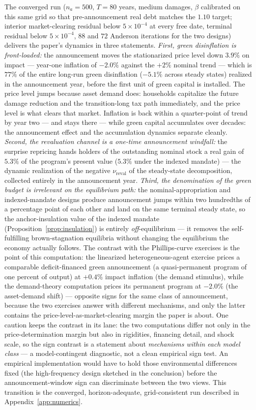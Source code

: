 \documentclass[12pt]{article}
\begin{document}
The converged run ($n_a = 500$, $T = 80$ years, medium damages, $\beta$
calibrated on this same grid so that pre-announcement real debt matches
the $1.10$ target; interior market-clearing residual below $5\times10^{-4}$
at every free date, terminal residual below $5\times10^{-4}$, $88$ and
$72$ Anderson iterations for the two designs) delivers the paper's
dynamics in three statements. \emph{First, green disinflation is
front-loaded:} the announcement moves the stationarized price level down
$3.9\%$ on impact --- year-one inflation of $-2.0\%$ against the $+2\%$
nominal trend --- which is $77\%$ of the entire long-run green
disinflation ($-5.1\%$ across steady states) realized in the announcement
year, before the first unit of green capital is installed. The price
level jumps because asset demand does: households capitalize the future
damage reduction and the transition-long tax path immediately, and the
price level is what clears that market. Inflation is back within a
quarter-point of trend by year two --- and stays there --- while green
capital accumulates over decades: the announcement effect and the
accumulation dynamics separate cleanly.
\emph{Second, the revaluation channel is a one-time announcement windfall:}
the surprise repricing hands holders of the outstanding nominal stock a
real gain of $5.3\%$ of the program's present value ($5.3\%$ under the
indexed mandate) --- the dynamic realization of the negative
$\nu_{\text{reval}}$ of the steady-state decomposition, collected entirely
in the announcement year. \emph{Third, the denomination of the green
budget is irrelevant on the equilibrium path:} the nominal-appropriation
and indexed-mandate designs produce announcement jumps within two
hundredths of a percentage point of each other and land on the same
terminal steady state, so the anchor-insulation value of the indexed
mandate (Proposition~\ref{prop:insulation}) is entirely
\emph{off}-equilibrium --- it removes the self-fulfilling brown-stagnation
equilibria without changing the equilibrium the economy actually follows.
The contrast with the Phillips-curve exercises is the point of this
computation: the linearized heterogeneous-agent exercise prices a
comparable deficit-financed green announcement (a quasi-permanent program of
one percent of output) at $+0.4\%$ impact inflation (the demand stimulus),
while the demand-theory computation prices its permanent program at
$-2.0\%$ (the asset-demand shift) --- opposite signs for the same class of
announcement, because the
two exercises answer with different mechanisms, and only the latter
contains the price-level-as-market-clearing margin the paper is about.
One caution keeps the contrast in its lane: the two computations differ
not only in the price-determination margin but also in rigidities,
financing detail, and shock scale, so the sign contrast is a statement
about \emph{mechanisms within each model class} --- a model-contingent
diagnostic, not a clean empirical sign test. An empirical implementation
would have to hold those environmental differences fixed (the
high-frequency design sketched in the conclusion) before the
announcement-window sign can discriminate between the two views. This
transition is the converged, horizon-adequate, grid-consistent run
described in Appendix~\ref{app:numerics}.
\end{document}
